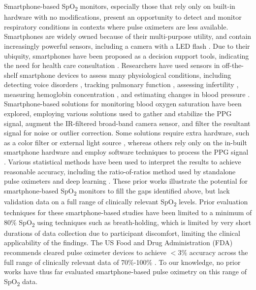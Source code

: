 \documentclass[12pt]{article}
\begin{document}
Smartphone-based SpO\textsubscript{2} monitors, especially those that rely only on built-in hardware with no modifications, present an opportunity to detect and monitor respiratory conditions in contexts where pulse oximeters are less available.  Smartphones are widely owned because of their multi-purpose utility, and contain increasingly powerful sensors, including a camera with a LED flash \cite{steinhubl2015emerging,gambhir2018toward,topol2019decade}. Due to their ubiquity, smartphones have been proposed as a decision support tools, indicating the need for health care consultation
\cite{kanakasabapathy2017automated,laksanasopin2015smartphone}. Researchers have used sensors in off-the-shelf smartphone devices to assess many physiological conditions, including detecting voice disorders \cite{mehta2012mobile}, tracking pulmonary function \cite{mehta2012mobile,larson2012spirosmart}, assessing infertility \cite{kanakasabapathy2017automated}, measuring hemoglobin concentration \cite{mannino2018smartphone,wang2017noninvasive}, and estimating changes in blood pressure \cite{wang2018seismo,chandrasekaran2012cuffless}. Smartphone-based solutions for monitoring blood oxygen saturation have been explored, employing various solutions used to gather and stabilize the PPG signal, augment the IR-filtered broad-band camera sensor, and filter the resultant signal for noise or outlier correction. Some solutions require extra hardware, such as a color filter or external light source \cite{mendelson1988noninvasive,carni2016setting,karlen2013detection,tayfur2019reliability,scully2011physiological,bui2020smartphone}, whereas others rely only on the in-built smartphone hardware and employ software techniques to process the PPG signal \cite{tomlinson2018accuracy,nemcova2020monitoring,ding2018measuring,lamonaca2015blood}. Various statistical methods have been used to interpret the results to achieve reasonable accuracy, including the ratio-of-ratios method used by standalone pulse oximeters \cite{bui2020smartphone} and deep learning \cite{ding2018measuring}.  These prior works illustrate the potential for smartphone-based SpO\textsubscript{2} monitors to fill the gaps identified above, but lack validation data on a full range of clinically relevant SpO\textsubscript{2} levels. Prior evaluation techniques for these smartphone-based studies have been limited to a minimum of 80\% SpO\textsubscript{2} using techniques such as breath-holding, which is limited by very short durations of data collection due to participant discomfort, 
limiting the clinical applicability of the findings. The US Food and Drug Administration (FDA) recommends cleared pulse oximeter devices to achieve $<3\%$ accuracy across the full range of clinically relevant data of 70\%-100\% \cite{luks2020pulse,us2013pulse}.  To our knowledge, no prior works have thus far evaluated smartphone-based pulse oximetry on this range of SpO\textsubscript{2} data. 
\end{document}
